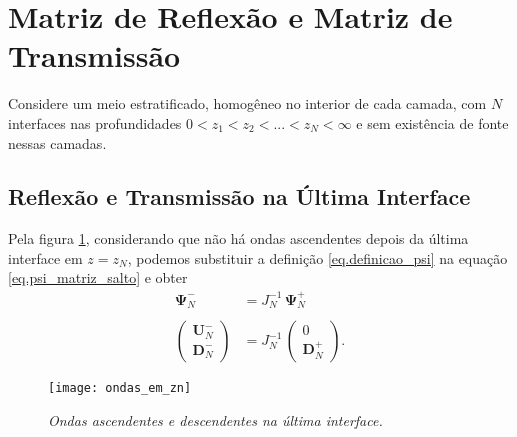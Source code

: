 \section{Matriz de Reflex\~ao e Matriz de Transmiss\~ao}

Considere um meio estratificado, homog\^eneo no interior de cada camada, com $N$ interfaces nas profundidades $0<z_1<z_2<...<z_N<\infty$ e sem exist\^encia de fonte nessas camadas. 

\subsection{Reflex\~ao e Transmiss\~ao na \'Ultima Interface}
Pela figura \ref{fig.ondas_em_zn}, considerando que n\~ao h\'a ondas ascendentes depois da \'ultima interface em $z=z_N$, podemos substituir a defini\c{c}\~ao \ref{eq.definicao_psi} na equa\c{c}\~ao \ref{eq.psi_matriz_salto} e obter
\begin{align*}
\mathbf{\Psi}_N^-&=J_N^{-1}\,\mathbf{\Psi}_N^+\\\\
\begin{pmatrix}
\mathbf{U}_N^-\\
\mathbf{D}_N^-
\end{pmatrix}
&=J_N^{-1}\,
\begin{pmatrix}
0\\
\mathbf{D}_N^+
\end{pmatrix}.
\end{align*}

\begin{figure}
\centering
\texttt{[image: ondas\_em\_zn]}
\caption{\textit{Ondas ascendentes e descendentes na \'ultima interface.}}
\label{fig.ondas_em_zn}
\end{figure}

